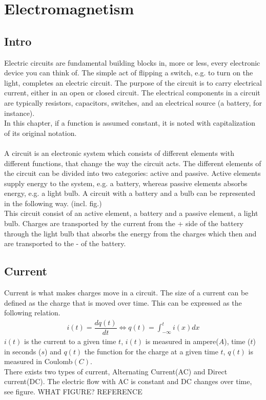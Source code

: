 \chapter{Electromagnetism}
\section{Intro}
Electric circuits are fundamental building blocks in, more or less, every electronic device you can think of. The simple act of flipping a switch, e.g. to turn on the light, completes an electric circuit. The purpose of the circuit is to carry electrical current, either in an open or closed circuit. The electrical components in a circuit are typically resistors, capacitors,  switches, and an electrical source (a battery, for instance).
\\ 
In this chapter, if a function is assumed constant, it is noted with capitalization of its original notation. 
\\ 
\\
A circuit is an electronic system which consists of different elements with different functions, that change the way the circuit acts. The different elements of the circuit can be divided into two categories: active and passive. Active elements supply energy to the system, e.g. a battery, whereas passive elements absorbs energy, e.g. a light bulb. A circuit with a battery and a bulb can be represented in the following way. (incl. fig.)\\ This circuit consist of an active element, a battery and a passive element, a light bulb. Charges are transported by the current from the + side of the battery through the light bulb that absorbs the energy from the charges which then and are transported to the - of the battery.
\\
\section{Current}
Current is what makes charges move in a circuit. The size of a current can be defined as the charge that is moved over time. This can be expressed as the following relation.
\begin{align}
i(t)=\dfrac{dq(t)}{dt} \Leftrightarrow q(t)=\int_{-\infty}^{t}i(x)dx
\end{align}
$i(t)$ is the current to a given time $t$, $i(t)$ is measured in ampere($A$), time ($t$) in seconds ($s$) and $q(t)$ the function for the charge at a given time $t$, $q(t)$ is measured in Coulomb$(C)$.
\\
There exists two types of current, Alternating Current(AC) and Direct current(DC). The electric flow with AC is constant and DC changes over time, see figure. WHAT FIGURE? REFERENCE
\\
